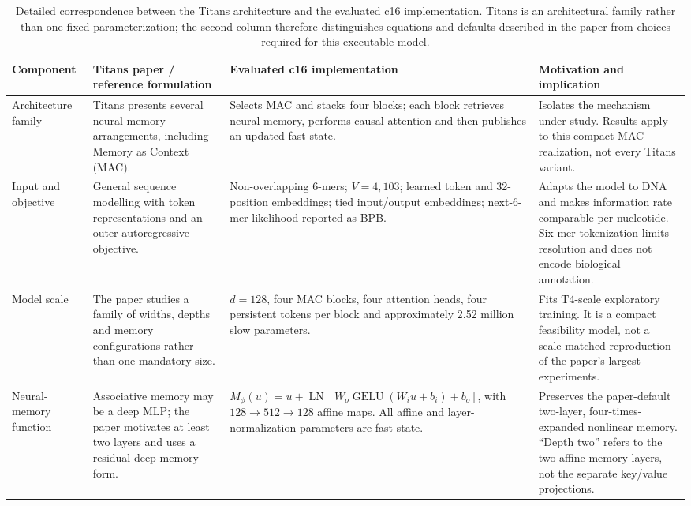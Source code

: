 \documentclass[10pt,twocolumn]{article}
\begin{document}
\begin{table}[!t]
\centering
\caption{Detailed correspondence between the Titans architecture and the evaluated c16 implementation. Titans is an architectural family rather than one fixed parameterization; the second column therefore distinguishes equations and defaults described in the paper from choices required for this executable model.}
\label{tab:mapping}
\scriptsize
\setlength{\tabcolsep}{3pt}
\renewcommand{\arraystretch}{1.12}
\begin{tabularx}{\textwidth}{@{}>{\raggedright\arraybackslash}p{}>{\raggedright\arraybackslash}p{}>{\raggedright\arraybackslash}p{}>{\raggedright\arraybackslash}X@{}}
\toprule
Component & Titans paper / reference formulation & Evaluated c16 implementation & Motivation and implication\\
\midrule
Architecture family & Titans presents several neural-memory arrangements, including Memory as Context (MAC). & Selects MAC and stacks four blocks; each block retrieves neural memory, performs causal attention and then publishes an updated fast state. & Isolates the mechanism under study. Results apply to this compact MAC realization, not every Titans variant.\\
Input and objective & General sequence modelling with token representations and an outer autoregressive objective. & Non-overlapping 6-mers; $V=4{,}103$; learned token and 32-position embeddings; tied input/output embeddings; next-6-mer likelihood reported as BPB. & Adapts the model to DNA and makes information rate comparable per nucleotide. Six-mer tokenization limits resolution and does not encode biological annotation.\\
Model scale & The paper studies a family of widths, depths and memory configurations rather than one mandatory size. & $d=128$, four MAC blocks, four attention heads, four persistent tokens per block and approximately 2.52 million slow parameters. & Fits T4-scale exploratory training. It is a compact feasibility model, not a scale-matched reproduction of the paper's largest experiments.\\
Neural-memory function & Associative memory may be a deep MLP; the paper motivates at least two layers and uses a residual deep-memory form. & $M_{\phi}(u)=u+\operatorname{LN}[W_o\operatorname{GELU}(W_i u+b_i)+b_o]$, with $128\rightarrow512\rightarrow128$ affine maps. All affine and layer-normalization parameters are fast state. & Preserves the paper-default two-layer, four-times-expanded nonlinear memory. ``Depth two'' refers to the two affine memory layers, not the separate key/value projections.\\

\end{tabularx}
\end{table}
\end{document}
